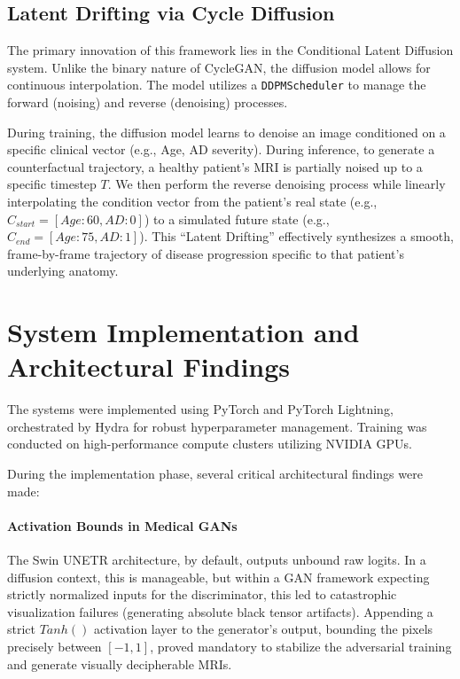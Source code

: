 \documentclass[conference]{IEEEtran}
\begin{document}
\subsection{Latent Drifting via Cycle Diffusion}
The primary innovation of this framework lies in the Conditional Latent Diffusion system. Unlike the binary nature of CycleGAN, the diffusion model allows for continuous interpolation. The model utilizes a \texttt{DDPMScheduler} to manage the forward (noising) and reverse (denoising) processes.

During training, the diffusion model learns to denoise an image conditioned on a specific clinical vector (e.g., Age, AD severity). During inference, to generate a counterfactual trajectory, a healthy patient's MRI is partially noised up to a specific timestep $T$. We then perform the reverse denoising process while linearly interpolating the condition vector from the patient's real state (e.g., $C_{start} = [Age: 60, AD: 0]$) to a simulated future state (e.g., $C_{end} = [Age: 75, AD: 1]$). This ``Latent Drifting'' effectively synthesizes a smooth, frame-by-frame trajectory of disease progression specific to that patient's underlying anatomy.

\section{System Implementation and Architectural Findings}

The systems were implemented using PyTorch and PyTorch Lightning, orchestrated by Hydra for robust hyperparameter management. Training was conducted on high-performance compute clusters utilizing NVIDIA GPUs. 

During the implementation phase, several critical architectural findings were made:
\paragraph{Activation Bounds in Medical GANs}
The Swin UNETR architecture, by default, outputs unbound raw logits. In a diffusion context, this is manageable, but within a GAN framework expecting strictly normalized inputs for the discriminator, this led to catastrophic visualization failures (generating absolute black tensor artifacts). Appending a strict $Tanh()$ activation layer to the generator's output, bounding the pixels precisely between $[-1, 1]$, proved mandatory to stabilize the adversarial training and generate visually decipherable MRIs.
\end{document}
